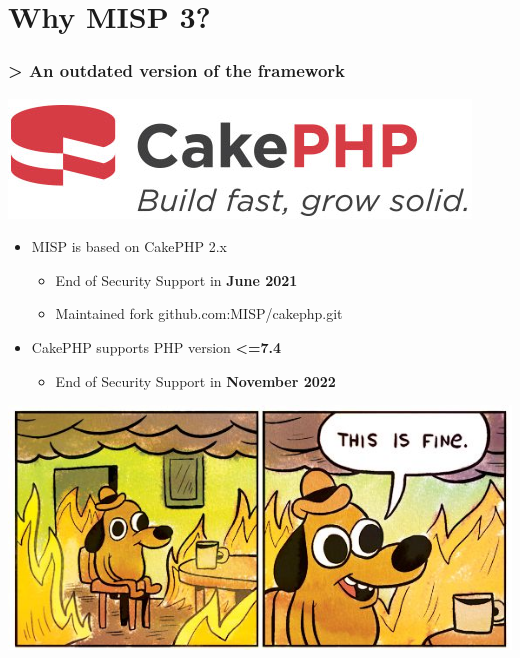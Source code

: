 \section{Why MISP 3?}
\begin{frame}
    \frametitle{> An outdated version of the framework}
    \begin{center}
        \includegraphics[width=0.3\linewidth]{pictures/cakephp.png}
    \end{center}
    \begin{itemize}
        \item MISP is based on CakePHP 2.x
        \begin{itemize}
            \item End of Security Support in {\bf June 2021}
            \item Maintained fork github.com:MISP/cakephp.git
        \end{itemize}
        \item CakePHP supports PHP version {\bf <=7.4}
        \begin{itemize}
            \item End of Security Support in {\bf November 2022}
        \end{itemize}
    \end{itemize}
    \begin{center}
        \includegraphics[width=0.5\linewidth]{pictures/this-is-fine.jpg}
    \end{center}
\end{frame}

